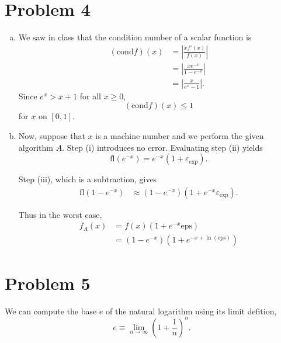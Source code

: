 \documentclass[12pt]{article}
\begin{document}
\section*{Problem 4}
\begin{enumerate}[(a)]
\item 
We saw in class that the condition number of a scalar function is
\begin{equation*}
\begin{aligned}
\left(\mathrm{cond} f\right)(x) &= \left|\frac{x f'(x)}{f(x)} \right| \\
&= \left|\frac{x e^{-x}}{1-e^{-x}}\right| \\
&= \left|\frac{x}{e^x-1}\right|.
\end{aligned}
\end{equation*}
Since $e^x > x + 1$ for all $x \geq 0$, 
\begin{equation*}
\left(\mathrm{cond} f\right)(x) \leq 1
\end{equation*}
for $x$ on $[0, 1]$.

\item 
Now, suppose that $x$ is a machine number and we perform the given algorithm $A$. Step (i) introduces no error. Evaluating step (ii) yields
\begin{equation*}
\mathrm{fl}(e^{-x}) = e^{-x}(1 + \varepsilon_{\exp}).
\end{equation*}

Step (iii), which is a subtraction, gives
\begin{equation*}
\begin{aligned}
\mathrm{fl}(1 - e^{-x}) &\approx (1 - e^{-x})(1 +e^{-x}\varepsilon_{\exp}).
\end{aligned}
\end{equation*}

Thus in the worst case,
\begin{equation*}
\begin{aligned}
f_A(x) &= f(x) (1 + e^{-x}\mathrm{eps}) \\
&= (1 - e^{-x})(1 + e^{-x + \ln{(\mathrm{eps})}})
\end{aligned}
\end{equation*}

\end{enumerate}


\section*{Problem 5}

We can compute the base $e$ of the natural logarithm using its limit defition, 
\begin{equation*}
e \equiv \lim_{n\rightarrow\infty}\left(1 + \frac{1}{n}\right)^n.
\end{equation*}
\end{document}
